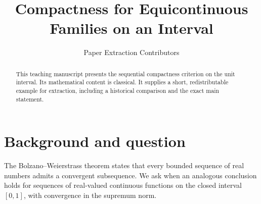 \documentclass{article}
\title{Compactness for Equicontinuous Families on an Interval}
\author{Paper Extraction Contributors}
\date{}
\begin{document}
\maketitle
\begin{abstract}
This teaching manuscript presents the sequential compactness criterion on
the unit interval. Its mathematical content is classical. It supplies a
short, redistributable example for extraction, including a historical
comparison and the exact main statement.
\end{abstract}
\section{Background and question}
The Bolzano--Weierstrass theorem states that every bounded sequence of
real numbers admits a convergent subsequence. We ask when an analogous
conclusion holds for sequences of real-valued continuous functions on
the closed interval $[0,1]$, with convergence in the supremum norm.

\end{document}
